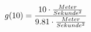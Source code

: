 \documentclass[preview]{standalone}
\begin{document}
\begin{align*}
\special{dvisvgm:raw <g id='unique000'>}g(10) = \frac{10 \cdot \frac{Meter}{Sekunde^{2}}}{9.81 \cdot \frac{Meter}{Sekunde^{2}}}\special{dvisvgm:raw </g>}
\end{align*}
\end{document}

